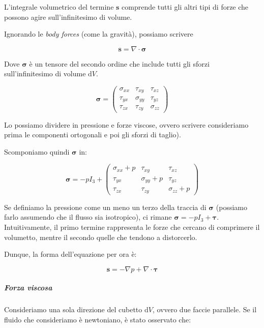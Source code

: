 \documentclass[12pt,a4paper]{article}
\numberwithin{equation}{subsection}
\begin{document}
L'integrale volumetrico del termine $\mathbf{s}$ comprende tutti gli altri tipi di forze che possono agire sull'infinitesimo di volume.

Ignorando le \emph{body forces} (come la gravità), possiamo scrivere

\begin{equation}
\mathbf{s} = \nabla \cdot \bm{\sigma}
\end{equation}

Dove $\bm{\sigma}$ è un tensore del secondo ordine che include tutti gli sforzi sull'infinitesimo di volume $\mathrm{d}V$. 

\begin{equation}
\bm{\sigma} = \begin{pmatrix}
\sigma_{xx} &  \tau_{xy} & \tau_{xz} \\
\tau_{yx} &  \sigma_{yy} & \tau_{yz} \\
\tau_{zx} &  \tau_{zy} & \sigma_{zz}
\end{pmatrix}
\end{equation}

Lo possiamo dividere in pressione e forze viscose, ovvero scrivere consideriamo prima le componenti ortogonali e poi gli sforzi di taglio).

Scomponiamo quindi $\bm{\sigma}$ in:

\begin{equation}
\bm{\sigma} = -p I_3 + \begin{pmatrix}
\sigma_{xx} + p &  \tau_{xy} & \tau_{xz} \\
\tau_{yx} &  \sigma_{yy} + p & \tau_{yz} \\
\tau_{zx} &  \tau_{zy} & \sigma_{zz} + p
\end{pmatrix}
\end{equation}

Se definiamo la pressione come un meno un terzo della traccia di $\bm{\sigma}$ (possiamo farlo assumendo che il flusso sia isotropico), ci rimane $\bm{\sigma} = -p I_3 + \bm{\tau}$. Intuitivamente, il primo termine rappresenta le forze che cercano di comprimere il volumetto, mentre il secondo quelle che tendono a distorcerlo.

Dunque, la forma dell'equazione per ora è:

\begin{equation}
\mathbf{s} = - \nabla p + \nabla \cdot \bm{\tau}
\end{equation}

\subparagraph{Forza viscosa}

Consideriamo una sola direzione del cubetto $\mathrm{d} V$, ovvero due faccie parallele. Se il fluido che consideriamo è newtoniano, è stato osservato che:
\end{document}
